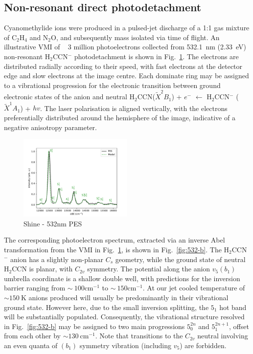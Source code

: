 \documentclass[journal=jpcafh,manuscript=article,layout=onecolumn, 12pt]{achemso}
\begin{document}
\subsection{Non-resonant direct photodetachment}
Cyanomethylide ions were produced in a pulsed-jet discharge of a 1:1 gas mixture of C$_2$H$_4$ and N$_2$O, and subsequently mass isolated via time of flight. An illustrative VMI of ~ 3 million photoelectrons collected from 532.1~nm (2.33~eV) non-resonant H$_2$CCN$^-$ photodetachment is shown in Fig.~\ref{fig:532}. The electrons are distributed radially according to their speed, with fast electrons at the detector edge and slow electrons at the image centre. Each dominate ring may be assigned to a vibrational progression for the electronic transition between ground electronic states of the anion and neutral H$_2$CCN($\tilde{X}^2B_1$) + $e^-$ $\leftarrow$ H$_2$CCN$^-$ ($\tilde{X}^1A_1$) + $hv$. The laser polarisation is aligned vertically, with the electrons preferentially distributed around the hemisphere of the image, indicative of a negative anisotropy parameter.

\begin{figure}
	\includegraphics[width=0.5\textwidth]{Figures/H2CCN-532.pdf}
	\caption{Shine - 532nm PES}
	\label{fig:532}
\end{figure}

The corresponding photoelectron spectrum, extracted via an inverse Abel transformation from the VMI in Fig.~\ref{fig:532}, is shown in Fig.~\ref{fig:532-b}. The H$_2$CCN$^-$ anion has a slightly non-planar $C_s$ geometry, while the ground state of neutral H$_2$CCN is planar, with $C_{2v}$ symmetry. The potential along the anion $v_5 (b_1)$ umbrella coordinate is a shallow double well, with predictions for the inversion barrier ranging from $\sim~100$cm$^{-1}$ to $\sim~150$cm$^{-1}$. At our jet cooled temperature of $\sim150~$K anions produced will usually be predominantly in their vibrational ground state. However here, due to the small inversion splitting, the $5_1$ hot band will be substantially populated. Consequently, the vibrational structure resolved in Fig.~\ref{fig:532-b} may be assigned to two main progressions $5_0^{2n}$ and $5_1^{2n+1}$, offset from each other by $\sim130~$cm$^{-1}$. Note that transitions to the $C_{2v}$ neutral involving an even quanta of $(b_1)$ symmetry vibration (including $v_5$) are forbidden. 
\end{document}
